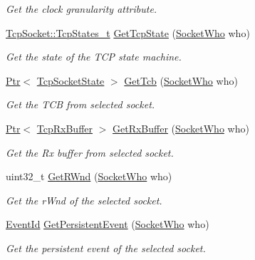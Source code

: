 \begin{DoxyCompactItemize}
\begin{DoxyCompactList}\small\item\em Get the clock granularity attribute. \end{DoxyCompactList}\item 
\hyperlink{group__tcp_ga3929cdb47bdf159657fa24054aa5ca03}{Tcp\+Socket\+::\+Tcp\+States\+\_\+t} \hyperlink{classns3_1_1TcpGeneralTest_acebf7ec83c86dae27f57767e8e62eb21}{Get\+Tcp\+State} (\hyperlink{classns3_1_1TcpGeneralTest_a29338e6b7137cad650c2ff835713f6ee}{Socket\+Who} who)
\begin{DoxyCompactList}\small\item\em Get the state of the T\+CP state machine. \end{DoxyCompactList}\item 
\hyperlink{classns3_1_1Ptr}{Ptr}$<$ \hyperlink{classns3_1_1TcpSocketState}{Tcp\+Socket\+State} $>$ \hyperlink{classns3_1_1TcpGeneralTest_a41500a9bdc54361db731c0538bd822fd}{Get\+Tcb} (\hyperlink{classns3_1_1TcpGeneralTest_a29338e6b7137cad650c2ff835713f6ee}{Socket\+Who} who)
\begin{DoxyCompactList}\small\item\em Get the T\+CB from selected socket. \end{DoxyCompactList}\item 
\hyperlink{classns3_1_1Ptr}{Ptr}$<$ \hyperlink{classns3_1_1TcpRxBuffer}{Tcp\+Rx\+Buffer} $>$ \hyperlink{classns3_1_1TcpGeneralTest_a9e695c4490162fcfb837c9a8f4ec18d5}{Get\+Rx\+Buffer} (\hyperlink{classns3_1_1TcpGeneralTest_a29338e6b7137cad650c2ff835713f6ee}{Socket\+Who} who)
\begin{DoxyCompactList}\small\item\em Get the Rx buffer from selected socket. \end{DoxyCompactList}\item 
uint32\+\_\+t \hyperlink{classns3_1_1TcpGeneralTest_aa42df354a8e014c967860fd49f31f300}{Get\+R\+Wnd} (\hyperlink{classns3_1_1TcpGeneralTest_a29338e6b7137cad650c2ff835713f6ee}{Socket\+Who} who)
\begin{DoxyCompactList}\small\item\em Get the r\+Wnd of the selected socket. \end{DoxyCompactList}\item 
\hyperlink{classns3_1_1EventId}{Event\+Id} \hyperlink{classns3_1_1TcpGeneralTest_a506c827969e3cafacb668145de706751}{Get\+Persistent\+Event} (\hyperlink{classns3_1_1TcpGeneralTest_a29338e6b7137cad650c2ff835713f6ee}{Socket\+Who} who)
\begin{DoxyCompactList}\small\item\em Get the persistent event of the selected socket. \end{DoxyCompactList}\item 

\end{DoxyCompactItemize}
